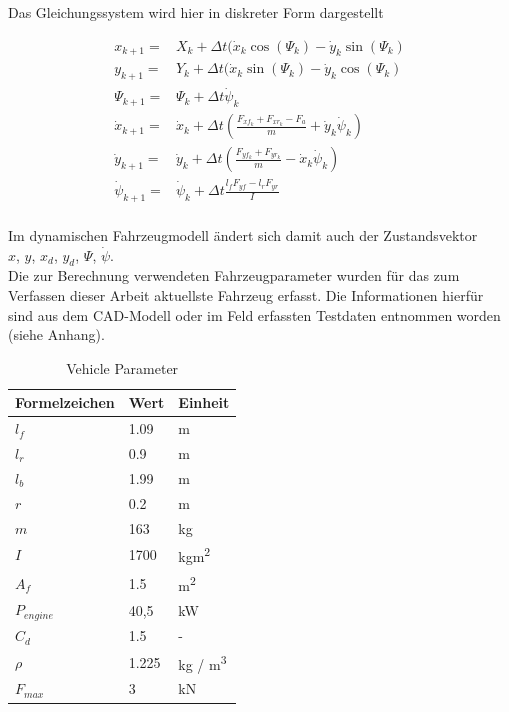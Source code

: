 \documentclass{like}
\begin{document}
Das Gleichungssystem wird hier in diskreter Form dargestellt

\begin{eqnarray}
x_{k+1} =& X_k + \Delta t(\dot{x}_k \cos(\Psi_k) - \dot{y}_k \sin(\Psi_k) \\
y_{k+1} =& Y_{k} + \Delta t(\dot{x}_k \sin(\Psi_k) - \dot{y}_k \cos(\Psi_k) \\
\Psi_{k+1} =& \Psi_k + \Delta t \dot{\psi}_k \\
\dot{x}_{k+1} =&  \dot{x}_k + \Delta t (\frac{F_{xf_k} +  F_{xr_k}- F_a}{m} + \dot{y}_k \dot{\psi}_k) \\
\dot{y}_{k+1} =&  \dot{y}_k + \Delta t (\frac{ F_{yf_k} +  F_{yr_k}}{m} - \dot{x}_k \dot{\psi}_k)  \\
\dot{\psi}_{k+1} =& \dot{\psi}_k + \Delta t \frac{ l_f F_{yf} -  l_r F_{yr}}{I} \\
\end{eqnarray}

Im dynamischen Fahrzeugmodell ändert sich damit auch der Zustandsvektor \\
\(x\), \(y\), \(x_d\), \(y_d\), \(\Psi\), \(\dot{\psi}\). \\

Die zur Berechnung verwendeten Fahrzeugparameter wurden für das zum Verfassen dieser Arbeit aktuellste Fahrzeug erfasst. Die Informationen hierfür sind aus dem CAD-Modell oder im Feld erfassten Testdaten entnommen worden (siehe Anhang).


\begin{table}[]
	\centering
	\begin{tabular}{l|l|l}
		\hline
		Formelzeichen	& Wert & Einheit \\ \hline
		\(l_f\)	&	1.09 & m\\
		\(l_r\)	&	0.9 & m\\
		\(l_b\)	&	1.99 & m \\
		\(r\)	&	0.2 & m \\
		\(m\)	&  	163 & kg\\
		\(I\)	&  	1700 & kgm\textsuperscript{2}\\
		\(A_f\)	&  	1.5 & m\textsuperscript{2}\\
		\(P_{engine}\) &  40,5 & kW\\
		\(C_d\)	&  	1.5 & - \\
		\(\rho\)	&  	1.225 & kg / m\textsuperscript{3}\\
		\(F_{max}\)	&  	3 & kN \\ 
	\end{tabular}
	\caption{Vehicle Parameter}
	\label{vehicleParam}
\end{table}
\end{document}
